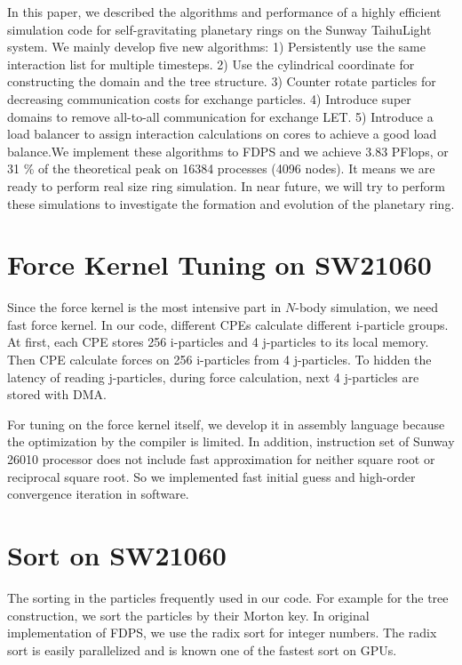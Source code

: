 \documentclass[]{pasj01}
\begin{document}
In this paper, we described the algorithms and performance of a highly
efficient simulation code for self-gravitating planetary rings on the
Sunway TaihuLight system. We mainly develop five new algorithms: 1)
Persistently use the same interaction list for multiple timesteps. 2)
Use the cylindrical coordinate for constructing the domain and the
tree structure. 3) Counter rotate particles for decreasing
communication costs for exchange particles. 4) Introduce super domains
to remove all-to-all communication for exchange LET. 5) Introduce a
load balancer to assign interaction calculations on cores to achieve a
good load balance.We implement these algorithms to FDPS and we achieve
3.83 PFlops, or 31 \% of the theoretical peak on 16384 processes (4096
nodes). It means we are ready to perform real size ring simulation. In
near future, we will try to perform these simulations to investigate
the formation and evolution of the planetary ring.

\appendix

\section{Force Kernel Tuning on SW21060}

Since the force kernel is the most intensive part in $N$-body
simulation, we need fast force kernel. In our code, different CPEs
calculate different i-particle groups. At first, each CPE stores 256
i-particles and 4 j-particles to its local memory. Then CPE calculate
forces on 256 i-particles from 4 j-particles. To hidden the latency of
reading j-particles, during force calculation, next 4 j-particles are
stored with DMA.

For tuning on the force kernel itself, we develop it in assembly
language because the optimization by the compiler is limited. In
addition, instruction set of Sunway 26010 processor does not include
fast approximation for neither square root or reciprocal square
root. So we implemented fast initial guess and high-order convergence
iteration in software.

\section{Sort on SW21060}

The sorting in the particles frequently used in our code. For example
for the tree construction, we sort the particles by their Morton key.
In original implementation of FDPS, we use the radix sort for integer
numbers. The radix sort is easily parallelized and is known one of the
fastest sort on GPUs.
\end{document}
